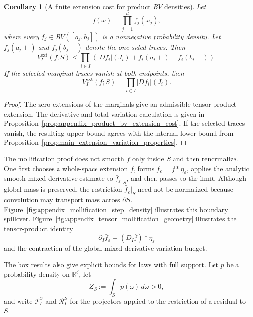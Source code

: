 \documentclass[11pt,letterpaper]{article}
\newtheorem{corollary}[theorem]{Corollary}
\theoremstyle{definition}
\theoremstyle{remark}
\begin{document}
\begin{corollary}[A finite extension cost for product $BV$ densities]
\label{cor:main_product_bv_extension_cost}
Let
$$
f(\omega)=\prod_{j=1}^df_j(\omega_j),
$$
where every $f_j\in BV([a_j,b_j])$ is a nonnegative probability density. Let
$f_j(a_j+)$ and $f_j(b_j-)$ denote the one-sided traces. Then
\begin{equation}
\label{eq:main_product_bv_extension_cost}
V_I^{\mathrm{ext}}(f;S)
\le
\prod_{i\in I}
\left(
|Df_i|(J_i)+f_i(a_i+)+f_i(b_i-)
\right).
\end{equation}
If the selected marginal traces vanish at both endpoints, then
\begin{equation}
\label{eq:main_product_bv_extension_equality}
V_I^{\mathrm{ext}}(f;S)
=
\prod_{i\in I}|Df_i|(J_i).
\end{equation}
\end{corollary}

\begin{proof}
The zero extensions of the marginals give an admissible tensor-product
extension. The derivative and total-variation calculation is given in
Proposition~\ref{prop:appendix_product_bv_extension_cost}. If the selected
traces vanish, the resulting upper bound agrees with the internal lower bound
from Proposition~\ref{prop:main_extension_variation_properties}.
\end{proof}

The mollification proof does not smooth $f$ only inside $S$ and then
renormalize. One first chooses a whole-space extension $\bar f$, forms
$\bar f_\varepsilon=\bar f*\eta_\varepsilon$, applies the analytic smooth
mixed-derivative estimate to $\bar f_\varepsilon|_S$, and then passes to the
limit. Although global mass is preserved, the restriction
$\bar f_\varepsilon|_S$ need not be normalized because convolution may
transport mass across $\partial S$. Figure~\ref{fig:appendix_mollification_step_density}
illustrates this boundary spillover. Figure~\ref{fig:appendix_tensor_mollification_geometry}
illustrates the tensor-product identity
$$
\partial_I\bar f_\varepsilon
=
(D_I\bar f)*\eta_\varepsilon
$$
and the contraction of the global mixed-derivative variation budget.

The box results also give explicit bounds for laws with full support. Let $p$
be a probability density on $\mathbb R^d$, let
$$
Z_S:=\int_Sp(\omega)\,d\omega>0,
$$
and write $\mathcal P_I^S$ and $\mathcal R_I^S$ for the projectors applied to
the restriction of a residual to $S$.
\end{document}
